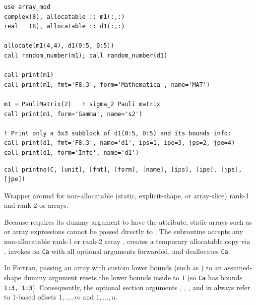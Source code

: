 \lstset{language=[95]Fortran}
\begin{lstlisting}
use array_mod
complex(8), allocatable :: m1(:,:)
real   (8), allocatable :: d1(:,:)

allocate(m1(4,4), d1(0:5, 0:5))
call random_number(m1); call random_number(d1)

call print(m1)
call print(m1, fmt='F8.3', form='Mathematica', name='MAT')

m1 = PauliMatrix(2)   ! sigma_2 Pauli matrix
call print(m1, form='Gamma', name='s2')

! Print only a 3x3 subblock of d1(0:5, 0:5) and its bounds info:
call print(d1, fmt='F8.3', name='d1', ips=1, ipe=3, jps=2, jpe=4)
call print(d1, form='Info', name='d1')
\end{lstlisting}


\lstset{language=[95]Fortran}
\begin{lstlisting}
call printna(C, [unit], [fmt], [form], [name], [ips], [ipe], [jps], [jpe])
\end{lstlisting}

Wrapper around  for non-allocatable (static, explicit-shape, or array-slice) rank-1 and rank-2  or  arrays.

Because  requires its dummy argument  to have the  attribute, static arrays such as  or array expressions cannot be passed directly to . The subroutine  accepts any non-allocatable rank-1 or rank-2 array , creates a temporary allocatable copy via , invokes  on \texttt{Ca} with all optional arguments forwarded, and deallocates \texttt{Ca}.

\begin{notebox}
In Fortran, passing an array with custom lower bounds (such as ) to an assumed-shape dummy argument  resets the lower bounds inside  to $1$ (so \texttt{Ca} has bounds \texttt{1:3, 1:3}). Consequently, the optional section arguments , , , and  in  always refer to 1-based offsets $1,\ldots,m$ and $1,\ldots,n$.
\end{notebox}

